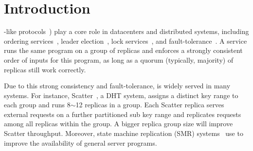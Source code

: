 \section{Introduction} \label{sec:intro}


\paxos-like protocols~\cite{paxos:practical,paxos,paxos:simple,paxos:complex})
play a core role in datacenters and distributed systems, including ordering
services~\cite{ellis:thesis,manos:hotdep10,scatter:sosp11},
leader election~\cite{zookeeper}, lock services~\cite{chubby:osdi}, and
fault-tolerance~\cite{eve:osdi12,rex:eurosys14,crane:sosp15}. A \paxos service
runs the same program on a group of replicas and enforces a strongly
consistent order of inputs for this program, as long as a quorum (typically,
majority) of replicas still work correctly.

Due to this strong consistency and fault-tolerance, \paxos is widely served
in many systems. For instance, Scatter~\cite{scatter:sosp11}, a DHT system,
assigns a distinct key range to each \paxos group and runs 8$\sim$12 replicas
in a group. Each Scatter replica serves external requests on a further
partitioned sub key range and replicates requests among all replicas within the
group. A bigger replica group size will improve Scatter throughput.
Moreover, state machine replication (SMR) systems~\cite{ crane:sosp15,
eve:osdi12, rex:eurosys14} use \paxos to improve the availability of
general server programs.






